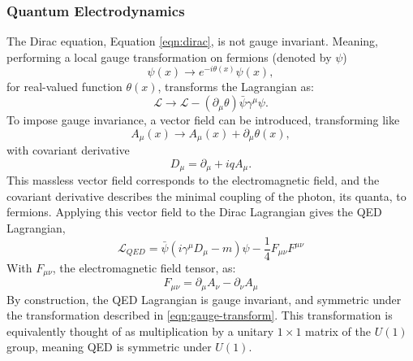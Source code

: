         \subsubsection{Quantum Electrodynamics}

        The Dirac equation, Equation \ref{eqn:dirac}, is not gauge invariant. Meaning, performing a local gauge transformation on fermions (denoted by $\psi$)
        \begin{equation} \label{eqn:gauge-transform}
            \psi(x) \rightarrow e^{-i\theta(x)}\psi(x),
        \end{equation}        
        for real-valued function $\theta(x)$, transforms the Lagrangian as:
        \begin{equation}
            \mathcal{L} \rightarrow \mathcal{L} - (\partial_{\mu}\theta)\bar{\psi}\gamma^{\mu}\psi.
        \end{equation}
        To impose gauge invariance, a vector field can be introduced, transforming like
        \begin{equation}
            A_{\mu}(x) \rightarrow A_{\mu}(x) + \partial_{\mu}\theta(x),
        \end{equation}
        with covariant derivative
        \begin{equation}
            D_{\mu} = \partial_{\mu} + iqA_{\mu}.
        \end{equation}
        This massless vector field corresponds to the electromagnetic field, and the covariant derivative describes the minimal coupling of the photon, its quanta, to fermions. Applying this vector field to the Dirac Lagrangian gives the \gls{QED} Lagrangian,
        \begin{equation}
            \mathcal{L}_{QED} = \bar{\psi} (i \gamma^{\mu} D_{\mu} - m)\psi - \frac{1}{4} F_{\mu \nu}F^{\mu \nu}
        \end{equation}
        With $F_{\mu \nu}$, the electromagnetic field tensor, as:
        \begin{equation}
        F_{\mu \nu} = \partial_{\mu}A_{\nu} - \partial_{\nu}A_{\mu}
        \end{equation}
        By construction, the \gls{QED} Lagrangian is gauge invariant, and symmetric under the transformation described in \ref{eqn:gauge-transform}. This transformation is equivalently thought of as multiplication by a unitary $1 \times 1$ matrix of the $U(1)$ group, meaning \gls{QED} is symmetric under $U(1)$.


